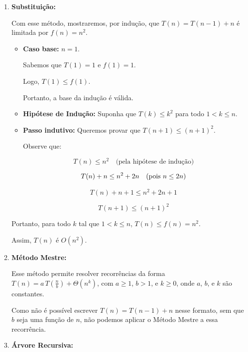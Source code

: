 \begin{enumerate}
	\item \textbf{Substituição:}

	      Com esse método, mostraremos, por indução, que \( T(n) = T(n-1) + n \) é limitada por \( f(n) = n^2 \).

	      \begin{itemize}
		      \item \textbf{Caso base:} \( n = 1 \).

		            Sabemos que \( T(1) = 1 \) e \( f(1) = 1 \).

		            Logo, \( T(1) \leq f(1) \).

		            Portanto, a base da indução é válida.

		      \item \textbf{Hipótese de Indução:} Suponha que \( T(k) \leq k^2 \) para todo \( 1 < k \leq n \).

		      \item \textbf{Passo indutivo:} Queremos provar que \( T(n+1) \leq (n+1)^2 \).

		            Observe que:

		            \[
			            T(n) \leq n^2 \quad \text{(pela hipótese de indução)}
		            \]

		            \[
			            T(n) + n \leq n^2 + 2n \quad \text{(pois \( n \leq 2n \))}
		            \]

		            \[
			            T(n) + n + 1 \leq n^2 + 2n + 1
		            \]

		            \[
			            T(n+1) \leq (n+1)^2
		            \]
	      \end{itemize}

	      Portanto, para todo \( k \) tal que \( 1 < k \leq n \), \( T(n) \leq f(n) = n^2 \).

	      Assim, \( T(n) \) é \( O(n^2) \).

	\item \textbf{Método Mestre:}

	      Esse método permite resolver recorrências da forma \( T(n) = a \, T\left(\frac{n}{b}\right) + \Theta(n^k) \), com \( a \geq 1 \), \( b > 1 \), e \( k \geq 0 \), onde \( a \), \( b \), e \( k \) são constantes.

	      Como não é possível escrever \( T(n) = T(n-1) + n \) nesse formato, sem que \( b \) seja uma função de \( n \), não podemos aplicar o Método Mestre a essa recorrência.


	\item \textbf{Árvore Recursiva:}


\end{enumerate}
